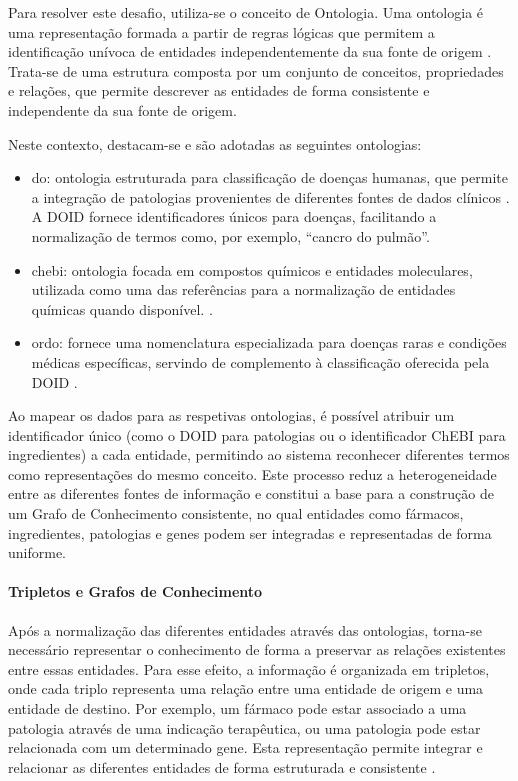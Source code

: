 Para resolver este desafio, utiliza-se o conceito de Ontologia. Uma ontologia é uma representação formada a partir de regras lógicas que permitem a identificação unívoca de entidades independentemente da sua fonte de origem \cite{guarino2009ontology}. Trata-se de uma estrutura composta por um conjunto de conceitos, propriedades e relações, que permite descrever as entidades de forma consistente e independente da sua fonte de origem.

Neste contexto, destacam-se e são adotadas as seguintes ontologias:

\begin{itemize}
\item \acrfull{do}: ontologia estruturada para classificação de doenças humanas, que permite a integração de patologias provenientes de diferentes fontes de dados clínicos \cite{schriml2022doid}. A DOID fornece identificadores únicos para doenças, facilitando a normalização de termos como, por exemplo, \enquote{cancro do pulmão}.

\item \acrfull{chebi}: ontologia focada em compostos químicos e entidades moleculares, utilizada como uma das referências para a normalização de entidades químicas quando disponível. \cite{hastings2016chebi}.

\item \acrfull{ordo}: fornece uma nomenclatura especializada para doenças raras e condições médicas específicas, servindo de complemento à classificação oferecida pela DOID \cite{ordo2017}.
\end{itemize}
Ao mapear os dados para as respetivas ontologias, é possível atribuir um identificador único (como o DOID para patologias ou o identificador ChEBI para ingredientes) a cada entidade, permitindo ao sistema reconhecer diferentes termos como representações do mesmo conceito. Este processo reduz a heterogeneidade entre as diferentes fontes de informação e constitui a base para a construção de um Grafo de Conhecimento consistente, no qual entidades como fármacos, ingredientes, patologias e genes podem ser integradas e representadas de forma uniforme.

\paragraph{Tripletos e Grafos de Conhecimento}
\label{subsec:triplets e grafos de conhecimento}
Após a normalização das diferentes entidades através das ontologias, torna-se necessário representar o conhecimento de forma a preservar as relações existentes entre essas entidades. Para esse efeito, a informação é organizada em tripletos, onde cada triplo representa uma relação entre uma entidade de origem e uma entidade de destino. Por exemplo, um fármaco pode estar associado a uma patologia através de uma indicação terapêutica, ou uma patologia pode estar relacionada com um determinado gene. Esta representação permite integrar e relacionar as diferentes entidades de forma estruturada e consistente \cite{ghazvinian2019knowledgegraphs}.

